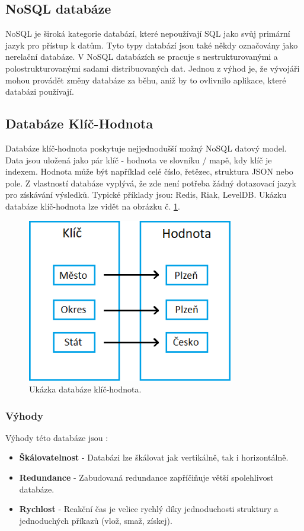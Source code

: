 \subsection{NoSQL databáze}
NoSQL je široká kategorie databází, které nepoužívají \gls{SQL} jako svůj primární jazyk pro přístup k datům. Tyto typy databází jsou také někdy označovány jako nerelační databáze. V NoSQL databázích se pracuje s nestrukturovanými a polostrukturovanými sadami distribuovaných dat. Jednou z výhod je, že vývojáři mohou provádět změny databáze za běhu, aniž by to ovlivnilo aplikace, které databázi používají.

\subsection{Databáze Klíč-Hodnota}
Databáze klíč-hodnota poskytuje nejjednodušší možný NoSQL datový model. Data jsou uložená jako pár klíč - hodnota ve slovníku / mapě, kdy klíč je indexem. Hodnota může být například celé číslo, řetězec, struktura \gls{JSON} nebo pole. Z vlastností databáze vyplývá, že zde není potřeba žádný dotazovací jazyk pro získávání výsledků. Typické příklady jsou: Redis, Riak, LevelDB. Ukázku databáze klíč-hodnota lze vidět na obrázku č. \ref{fig:db_img_keyvalue}.
	\begin{figure}[H]
	\centering
	\includegraphics[width=9cm]{img/databaze/keyvalue_db}
	\caption{Ukázka databáze klíč-hodnota.}
	\label{fig:db_img_keyvalue}
	\end{figure}
\subsubsection{Výhody}
Výhody této databáze jsou \cite{advantages_keyvalue}:
\begin{itemize}
\item \textbf{Škálovatelnost} - Databázi lze škálovat jak vertikálně, tak i horizontálně. 
\item \textbf{Redundance} - Zabudovaná redundance zapříčiňuje větší spolehlivost databáze.
\item \textbf{Rychlost} - Reakční čas je velice rychlý díky jednoduchosti struktury a jednoduchých příkazů (vlož, smaž, získej).
\end{itemize}

